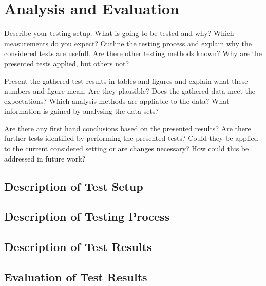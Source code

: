 \chapter{Analysis and Evaluation}
\label{ch:analysis_evaluation}

Describe your testing setup. What is going to be tested and why? Which
measurements do you expect? Outline the testing process and explain why the
considered tests are usefull. Are there other testing methods known? Why are the
presented tests applied, but others not?

Present the gathered test results in tables and
figures and explain what these numbers and figure mean. Are they plausible?
Does the gathered data meet the expectations? Which analysis methods are
appliable to the data? What information is gained by analysing the data sets?

Are there any first hand conclusions based on the presented results? Are there
further tests identified by performing the presented tests? Could they be applied
to the current considered setting or are changes necessary? How could this be
addressed in future work?


\section{Description of Test Setup}
\label{sec:eval:test_setup}


\section{Description of Testing Process}
\label{sec:eval:test_process}


\section{Description of Test Results}
\label{sec:eval:test_results}


\section{Evaluation of Test Results}
\label{sec:eval:eval_results}


